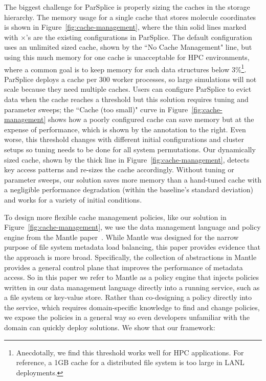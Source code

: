 The biggest challenge for ParSplice is properly sizing the caches in the
storage hierarchy.  The memory usage for a single cache that stores molecule
coordinates is shown in Figure~\ref{fig:cache-management}, where the thin solid
lines marked with \(\times\)'s are the existing configurations in ParSplice.
The default configuration uses an unlimited sized cache, shown by the ``No
Cache Management" line, but using this much memory for one cache is
unacceptable for HPC environments, where a common goal is to keep memory for
such data structures below 3\%\footnote{Anecdotally, we find this threshold
works well for HPC applications.  For reference, a 1GB cache for a distributed
file system is too large in LANL deployments.}. ParSplice deploys a cache per
300 worker processes, so large simulations will not scale because they need
multiple caches.  Users can configure ParSplice to evict data when the cache
reaches a threshold but this solution requires tuning and parameter sweeps; the
``Cache (too small)" curve in Figure~\ref{fig:cache-management} shows how a
poorly configured cache can save memory but at the expense of performance,
which is shown by the annotation to the right.  Even worse, this threshold
changes with different initial configurations and cluster setups so tuning
needs to be done for all system permutations.  Our dynamically sized cache,
shown by the thick line in Figure~\ref{fig:cache-management}, detects key
access patterns and re-sizes the cache accordingly.  Without tuning or
parameter sweeps, our solution saves more memory than a hand-tuned cache with a
negligible performance degradation (within the baseline's standard deviation)
and works for a variety of initial conditions.

To design more flexible cache management policies, like our solution in
Figure~\ref{fig:cache-management}, we use the data management language and
policy engine from the Mantle paper~\cite{sevilla:sc15-mantle}.  While Mantle
was designed for the narrow purpose of file system metadata load balancing,
this paper provides evidence that the approach is more broad.  Specifically,
the collection of abstractions in Mantle provides a general control plane that
improves the performance of metadata access. So in this paper we refer to
Mantle as a policy engine that injects policies written in our data management
language directly into a running service, such as a file system or key-value
store.  Rather than co-designing a policy directly into the service, which
requires domain-specific knowledge to find and change policies, we expose the
policies in a general way so even developers unfamiliar with the domain can
quickly deploy solutions.  We show that our framework:

